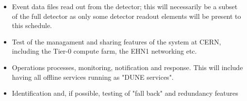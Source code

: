 \documentclass[pdftex,12pt,letter]{article}
\begin{document}
\begin {itemize}
\begin{itemize}
\item Event data files read out from the detector; this will necessarily be a subset of the full detector as only some detector readout elements will be present to this schedule.

\item Test of the managament and sharing features of the system at CERN, including the Tier-0 compute farm, the EHN1 networking etc. 

\item Operations processes, monitoring, notification and response. This will include having all offline services running as "DUNE services". 


\item  Identification and,  if possible,  testing of "fall back" and redundancy features  

\end{itemize}



\end{itemize}





\clearpage
\end{document}
